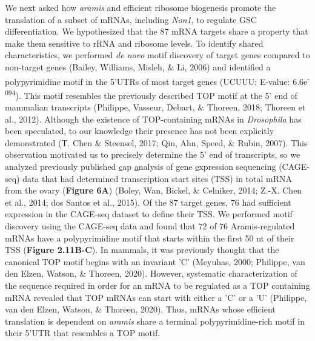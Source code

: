 \documentclass[12pt,oneside]{reedthesis}
\begin{document}
We next asked how \emph{aramis} and efficient ribosome biogenesis promote the
translation of a subset of mRNAs, including \emph{Non1}, to regulate GSC
differentiation. We hypothesized that the 87 mRNA targets share a
property that make them sensitive to rRNA and ribosome levels. To
identify shared characteristics, we performed \emph{de novo} motif discovery
of target genes compared to non-target genes (Bailey, Williams, Misleh, \& Li, 2006) and
identified a polypyrimidine motif in the 5'UTRs of most target genes
(UCUUU; E-value: 6.6e\textsuperscript{-094}). This motif resembles the previously
described TOP motif at the 5' end of mammalian transcripts
(Philippe, Vasseur, Debart, \& Thoreen, 2018; Thoreen et al., 2012). Although the existence of
TOP-containing mRNAs in \emph{Drosophila} has been speculated, to our
knowledge their presence has not been explicitly demonstrated
(T. Chen \& Steensel, 2017; Qin, Ahn, Speed, \& Rubin, 2007). This observation motivated us to
precisely determine the 5' end of transcripts, so we analyzed previously
published \underline{c}ap \underline{a}nalysis of \underline{g}ene
\underline{e}xpression sequencing (CAGE-seq) data that had determined
transcription start sites (TSS) in total mRNA from the ovary (\textbf{Figure
6A}) (Boley, Wan, Bickel, \& Celniker, 2014; Z.-X. Chen et al., 2014; dos Santos et al., 2015). Of the 87 target genes,
76 had sufficient expression in the CAGE-seq dataset to define their
TSS. We performed motif discovery using the CAGE-seq data and found that
72 of 76 Aramis-regulated mRNAs have a polypyrimidine motif that starts
within the first 50 nt of their TSS (\textbf{Figure 2.11B-C}). In mammals, it
was previously thought that the canonical TOP motif begins with an
invariant 'C' (Meyuhas, 2000; Philippe, van den Elzen, Watson, \& Thoreen, 2020). However, systematic
characterization of the sequence required in order for an mRNA to be
regulated as a TOP containing mRNA revealed that TOP mRNAs can start
with either a 'C' or a 'U' (Philippe, van den Elzen, Watson, \& Thoreen, 2020). Thus,
mRNAs whose efficient translation is dependent on \emph{aramis} share a
terminal polypyrimidine-rich motif in their 5'UTR that resembles a TOP
motif.
\end{document}

